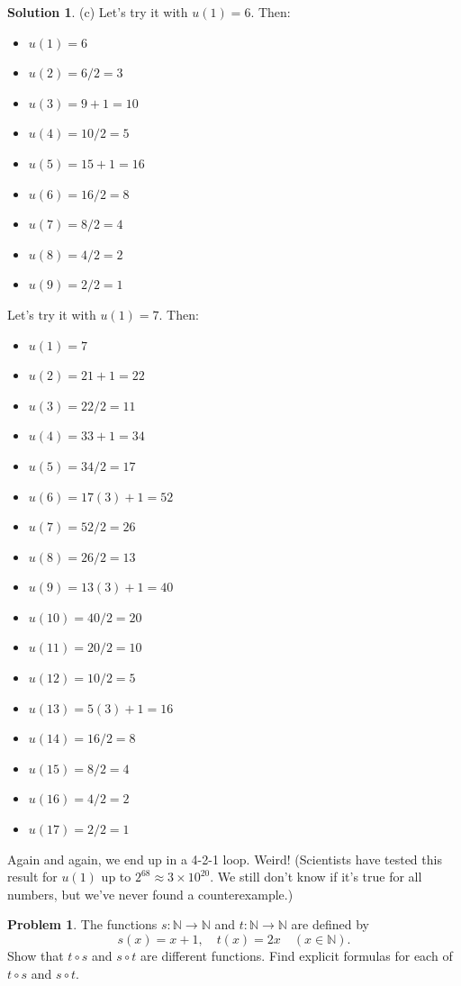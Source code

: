 \documentclass{article}
\numberwithin{equation}{section}
\theoremstyle{plain}
\theoremstyle{definition}
\newtheorem{problem}{Problem}
\newtheorem*{solution*}{Solution}
\newcommand{\N}{\mathbb N}
\begin{document}
\begin{solution*}
	(c) Let's try it with $u(1) = 6$. Then: 
	\begin{itemize}
		\item $u(1) = 6$
		\item $u(2) = 6/2 = 3$
		\item $u(3) = 9+1 = 10$
		\item $u(4) = 10/2 = 5$
		\item $u(5) = 15+1=16$ 
		\item $u(6) = 16/2 = 8$
		\item $u(7) = 8/2 = 4$
		\item $u(8) = 4/2 = 2$
		\item $u(9) = 2/2 = 1$
	\end{itemize}
	Let's try it with $u(1) = 7$. Then: 
	\begin{itemize}
		\item $u(1) = 7$
		\item $u(2) = 21 + 1 = 22$
		\item $u(3) = 22/2 = 11$
		\item $u(4) = 33+1 = 34$
		\item $u(5) = 34/2 = 17$
		\item $u(6) = 17(3) + 1 = 52$
		\item $u(7) = 52/2 = 26$
		\item $u(8) = 26/2 = 13$
		\item $u(9) = 13(3) + 1 = 40$
		\item $u(10) = 40/2 = 20$
		\item $u(11) = 20/2 = 10$
		\item $u(12) = 10/2 = 5$
		\item $u(13) = 5(3)+1 = 16$
		\item $u(14) = 16/2 = 8$
		\item $u(15) = 8/2 = 4$
		\item $u(16) = 4/2 = 2$
		\item $u(17) = 2/2 = 1$
	\end{itemize}
	Again and again, we end up in a 4-2-1 loop. Weird! (Scientists have tested this result for $u(1)$ up to $2^{68} \approx 3\times 10^{20}$. We still don't know if it's true for all numbers, but we've never found a counterexample.)
\end{solution*}

\begin{problem}
	The functions $s : \N \to \N$ and $t : \N \to \N$ are defined by \[
	s(x) = x+1, \quad t(x) = 2x \quad (x \in \N).
	\]
	Show that $t \circ s$ and $s \circ t$ are different functions. Find explicit formulas for each of $t \circ s$ and $s \circ t$. 
\end{problem}
\end{document}
